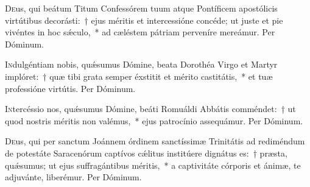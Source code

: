 \documentclass[vesperale_romanum.tex]{subfiles}
\begin{document}

\myrule
\newpage


\duplexmtv

\oratio

\lettrine{D}{e}us, qui beátum Titum Confessórem tuum atque Pontíficem apostólicis virtútibus decorásti:~† ejus méritis et intercessióne concéde; ut juste et pie vivéntes in hoc sǽculo,~* ad cæléstem pátriam perveníre mereámur. Per Dóminum.




\oratio

\lettrine{I}{n}dulgéntiam nobis, quǽsumus Dómine, beata Dorothéa Virgo et Martyr implóret:~† quæ tibi grata semper éxstitit et mérito castitátis,~* et tuæ professióne virtútis. Per Dóminum.

\capitdeseqquad

\myrule


\duplexmtv

\oratio

\lettrine{I}{n}tercéssio nos, quǽsumus Dómine, beáti Romuáldi Abbátis comméndet:~† ut quod nostris méritis non valémus,~* ejus patrocínio assequámur. Per Dóminum.


\capitdeseqquad

\myrule
\newpage
{}

\duplexmtv

\oratio

\lettrine{D}{e}us, qui per sanctum Joánnem órdinem sanctíssimæ Trinitátis ad rediméndum de potestáte Saracenórum captívos cǽlitus institúere dignátus es:~† præsta, quǽsumus; ut ejus suffragántibus méritis,~* a captivitáte córporis et ánimæ, te adjuvánte, liberémur.
Per Dóminum.
\end{document}
